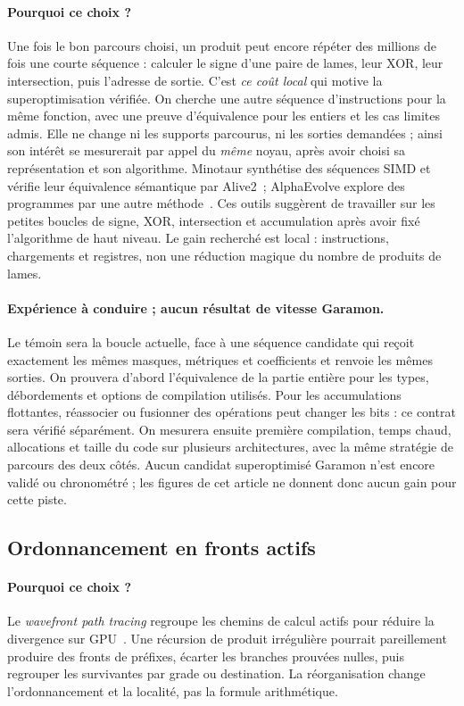 \documentclass[11pt,a4paper]{article}
\begin{document}
\paragraph{Pourquoi ce choix ?}
Une fois le bon parcours choisi, un produit peut encore répéter des
millions de fois une courte séquence : calculer le signe d'une paire de
lames, leur XOR, leur intersection, puis l'adresse de sortie. C'est
\emph{ce coût local} qui motive la superoptimisation vérifiée. On cherche
une autre séquence d'instructions pour la même fonction, avec une preuve
d'équivalence pour les entiers et les cas limites admis. Elle ne change
ni les supports parcourus, ni les sorties demandées ; ainsi son intérêt
se mesurerait par appel du \emph{même} noyau, après avoir choisi sa
représentation et son algorithme.
Minotaur synthétise des séquences SIMD et vérifie leur équivalence
sémantique par Alive2~\cite{minotaur}; AlphaEvolve explore des programmes
par une autre méthode~\cite{alphaevolve}. Ces outils suggèrent de travailler
sur les petites boucles de signe, XOR, intersection et accumulation après
avoir fixé l'algorithme de haut niveau. Le gain recherché est local :
instructions, chargements et registres, non une réduction magique du
nombre de produits de lames.

\paragraph{Expérience à conduire ; aucun résultat de vitesse Garamon.}
Le témoin sera la boucle actuelle, face à une séquence candidate qui
reçoit exactement les mêmes masques, métriques et coefficients et renvoie
les mêmes sorties. On prouvera d'abord l'équivalence de la partie entière
pour les types, débordements et options de compilation utilisés. Pour les
accumulations flottantes, réassocier ou fusionner des opérations peut
changer les bits : ce contrat sera vérifié séparément. On mesurera
ensuite première compilation, temps chaud, allocations et taille du code
sur plusieurs architectures, avec la même stratégie de parcours des deux
côtés. Aucun candidat superoptimisé Garamon n'est encore validé ou
chronométré ; les figures de cet article ne donnent donc aucun gain pour
cette piste.

\subsection{Ordonnancement en fronts actifs}
\paragraph{Pourquoi ce choix ?}
Le \emph{wavefront path tracing} regroupe les chemins de calcul actifs
pour réduire la divergence sur GPU~\cite{lainewavefront}. Une récursion de
produit irrégulière pourrait pareillement produire des fronts de préfixes,
écarter les branches prouvées nulles, puis regrouper les survivantes par
grade ou destination. La réorganisation change l'ordonnancement et la
localité, pas la formule arithmétique.
\end{document}
